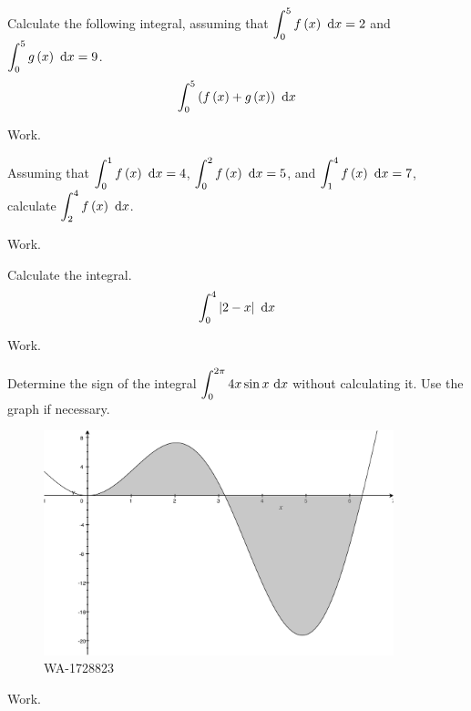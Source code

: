 \documentclass[12pt,addpoints, answers, fleqn]{exam}
\begin{document}
\begin{teacher}
\begin{questions}
\question 	%

Calculate the following integral, assuming that $\displaystyle \int_{0}^{5} f \left( x \right) \ {\rm{d}}x = 2$ and $\displaystyle \int_{0}^{5} g \left( x \right) \ {\rm{d}}x=9$.
\[
\int_{0}^{5} \left( f \left( x \right) + g \left( x \right) \right) \ {\rm{d}}x
\]
\begin{solution}
Work.
\end{solution}

\question 	%

Assuming that $\displaystyle \int_{0}^{1} f \left( x \right) \ {\rm{d}}x=4$, $\displaystyle \int_{0}^{2} f \left( x \right) \ {\rm{d}}x=5$, and $\displaystyle \int_{1}^{4} f \left( x \right) \ {\rm{d}}x=7$, calculate $\displaystyle \int_{2}^{4} f \left( x \right) \ {\rm{d}}x$.

\begin{solution}
Work.
\end{solution}

\question 	%

Calculate the integral.
\[
\int_{0}^{4} \left| 2 - x \right| \ {\rm{d}}x
\]

\begin{solution}
Work.
\end{solution}


\question 	%

Determine the sign of the integral  $\displaystyle \int_{0}^{2\pi} 4x \sin x \ {\rm{d}}x$ without calculating it. Use the graph if necessary.
\begin{figure}[htbp] %
   \centering
   \includegraphics[width=4in]{./graphics/1728823.pdf} 
   \caption{WA-1728823}
   \label{fig:1728823}
\end{figure}
 
 \begin{solution}
Work.
\end{solution}


\end{questions}
\end{teacher}
\vfill
\pagebreak
\end{document}
